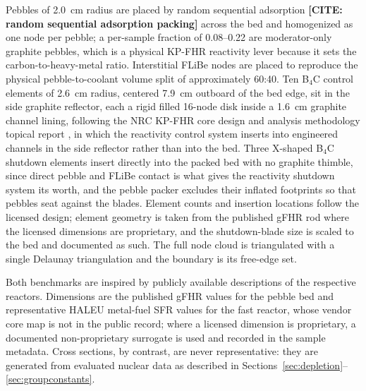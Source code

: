 \documentclass[preprint,12pt]{elsarticle}
\newcommand{\todocite}[1]{\textbf{[CITE: #1]}}
\begin{document}
Pebbles of 2.0~cm radius are placed by random sequential adsorption
\todocite{random sequential adsorption packing} across the
bed and homogenized as one node per pebble; a per-sample fraction of 0.08--0.22
are moderator-only graphite pebbles, which is a physical KP-FHR reactivity
lever because it sets the carbon-to-heavy-metal ratio. Interstitial FLiBe nodes
are placed to reproduce the physical pebble-to-coolant volume split of
approximately 60:40. Ten B$_4$C control elements of 2.6~cm radius, centered
7.9~cm outboard of the bed edge, sit in the side graphite reflector, each a
rigid filled 16-node disk inside a 1.6~cm graphite channel lining, following
the NRC KP-FHR core design and analysis methodology topical report
\citep{kpfhr2024}, in which the reactivity control system
inserts into engineered channels in the side reflector rather than into the
bed. Three X-shaped B$_4$C shutdown elements insert directly into the packed
bed with no graphite thimble, since direct pebble and FLiBe contact is what
gives the reactivity shutdown system its worth, and the pebble packer excludes
their inflated footprints so that pebbles seat against the blades. Element
counts and insertion locations follow the licensed design; element geometry is
taken from the published gFHR rod where the licensed dimensions are
proprietary, and the shutdown-blade size is scaled to the bed and documented as
such. The full node cloud is triangulated with a single Delaunay triangulation
and the boundary is its free-edge set.

Both benchmarks are inspired by publicly available descriptions of the
respective reactors. Dimensions are the published gFHR values for the pebble
bed and representative HALEU metal-fuel SFR values for the fast reactor, whose
vendor core map is not in the public record; where a licensed dimension is
proprietary, a documented non-proprietary surrogate is used and recorded in the
sample metadata. Cross sections, by contrast, are never representative: they
are generated from evaluated nuclear data as described in
Sections~\ref{sec:depletion}--\ref{sec:groupconstants}.
\end{document}
